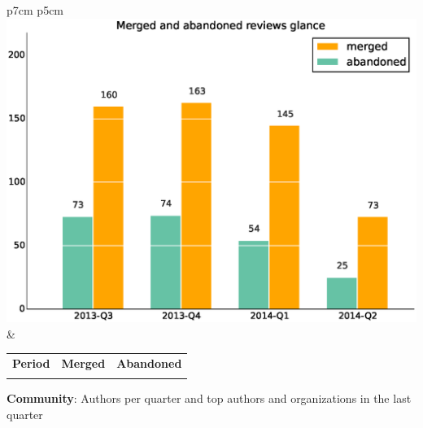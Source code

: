 \documentclass[a4wide,11pt]{report}
\begin{document}
\begin{tabular}{p{7cm} p{5cm}}
    \vspace{0pt} 
    \includegraphics[scale=.35]{figs/submitted_reviewsglance.eps}
    & 
    \vspace{0pt}
    \begin{tabular}{l|r|r|}%
    \bfseries Period & \bfseries Merged & \bfseries Abandoned %
    \csvreader[head to column names]{data/submitted_reviewsglance.csv}{}%
    {\\ & \merged & \abandoned}
    \end{tabular}
\end{tabular}


\textbf{Community}: Authors per quarter and top authors and organizations in the last quarter
\end{document}
